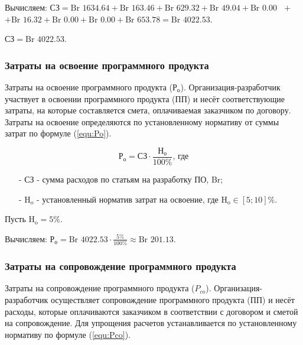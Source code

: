 Вычисляем: $\text{СЗ} =
\text{Br } 1634.64
+ \text{Br } 163.46
+ \text{Br } 629.32
+ \text{Br } 49.04
+ \text{Br } 0.00
\text{ } +$
$+ \text{Br } 16.32
+ \text{Br } 0.00
+ \text{Br } 0.00
+ \text{Br } 653.78
= \text{Br } 4022.53$.

$\text{СЗ} = \text{Br } 4022.53$.

\subsubsection*{Затраты на освоение программного продукта}

Затраты на освоение программного продукта ($\text{Р}_\text{о}$).
Организация\/-\hspace{0pt}разработчик участвует в освоении программного продукта (ПП) и несёт соответствующие затраты,
на которые составляется смета, оплачиваемая заказчиком по договору.
Затраты на освоение определяются по установленному нормативу от суммы затрат по формуле (\ref{equ:Po}). 

\begin{equation}
    \label{equ:Po}
    \text{Р}_\text{о} = \text{СЗ} \cdot \frac{ \text{Н}_\text{о} }{ 100\% } \text{, где}
\end{equation}

\begin{enumerate}
    \item[-] $\text{СЗ}$ - сумма расходов по статьям на разработку ПО, Br; 
    \item[-] $\text{H}_\text{o}$ - установленный норматив затрат на освоение, где $\text{H}_\text{o} \in [5; 10]\%$.
\end{enumerate}

Пусть $\text{H}_\text{o} = 5\%$.

Вычисляем: $\text{Р}_\text{о} = \text{Br } 4022.53 \cdot \frac{ 5\% }{ 100\% } \approx \text{Br } 201.13$.

\subsubsection*{Затраты на сопровождение программного продукта}

Затраты на сопровождение программного продукта ($P_{co}$).
Организация\/-\hspace{0pt}разработчик осуществляет сопровождение программного продукта (ПП) и несёт расходы,
которые оплачиваются заказчиком в соответствии с договором и сметой на сопровождение.
Для упрощения расчетов устанавливается по установленному нормативу по формуле (\ref{equ:Pco}).

